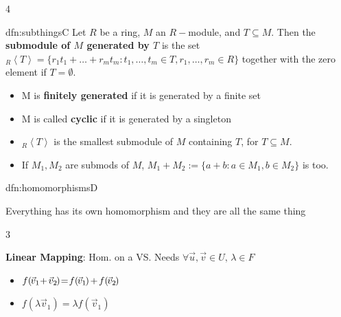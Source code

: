 \documentclass[landscape, 8pt]{extarticle}
\begin{document}
\begin{multicols*}{4}
\begin{mdfn}{dfn:subthings}{C}
				Let $R$ be a ring, $M$ an $R-$module, and $T \subseteq M$. Then the \textbf{submodule of $M$ generated by $T$} is the set $_R \left\langle T\right\rangle = \{r_1t_1 + \dots + r_mt_m: t_1, \dots, t_m \in T, r_1, \dots, r_m \in R\}$ together with the zero element if $T = \emptyset$.
				\begin{itemize}
					\item M is \textbf{finitely generated} if it is generated by a finite set
					\item M is called \textbf{cyclic} if it is generated by a singleton
					\item $_R \left\langle T\right\rangle$ is the smallest submodule of $M$ containing $T$, for $T \subseteq M$.
					\item If $M_1, M_2$ are submods of $M$, $M_1 + M_2 := \{a + b : a \in M_1, b \in M_2\}$ is too.
				\end{itemize}
			
		\end{mdfn}
		
		
		\begin{mdfn}{dfn:homomorphisms}{D}
			
			Everything has its own homomorphism and they are all the same thing
			
			
			
		{
			\setlength{\columnseprule}{0.5pt}
			\begin{multicols}{3}
				
				\vspace*{-7ex}
				
				\textbf{Linear Mapping}: Hom. on a VS. Needs $\forall\vec{u}, \vec{v}\in U,\,\lambda\in F$
				\begin{itemize}[leftmargin=*]
					\item $f(\hspace{-1pt}\vec{v}_{1} \hspace{-2pt} + \hspace{-1pt} \vec{v}_{2}\hspace{-1pt}) \hspace{-2pt}=\hspace{-2pt} f(\hspace{-1pt}\vec{v}_{1}\hspace{-1pt})\hspace{-1pt} +\hspace{-1pt} f(\hspace{-1pt}\vec{v}_{2}\hspace{-1pt})$
					\item $f(\lambda \vec{v}_{1}) = \lambda f(\vec{v}_{1})$
				\end{itemize}
				

\end{multicols}}
\end{mdfn}
\end{multicols*}
\end{document}
